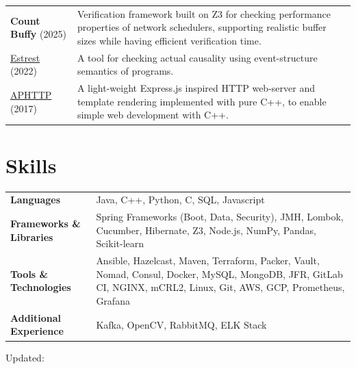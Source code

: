 \documentclass[a4paper,12pt]{article}
\newcommand{\monthyear}{\monthname[\the\month] \the\year}
\begin{document}
    \begin{tabularx}{\linewidth}{ @{}l X@{} }
        \textbf{Count Buffy} (2025) & Verification framework built on Z3 for checking performance properties of network schedulers, supporting realistic buffer sizes while having efficient verification time.\\
        \href{https://github.com/seyhani/Estrest}{Estrest} (2022) & A tool for checking actual causality using event-structure semantics of programs.\\
        \href{https://github.com/UTAP/APHTTP}{APHTTP} (2017) & A light-weight Express.js inspired HTTP web-server and template rendering implemented with pure C++, to enable simple web development with C++. \\
    \end{tabularx}

    \section{Skills}
    \begin{tabularx}{\linewidth}{@{}l X@{}}
        \textbf{Languages} & Java, C++, Python, C, SQL, Javascript \\
        \textbf{Frameworks \& Libraries} & Spring Frameworks (Boot, Data, Security), JMH, Lombok, Cucumber, Hibernate, Z3, Node.js, NumPy, Pandas, Scikit-learn \\
        \textbf{Tools \& Technologies} & Ansible, Hazelcast, Maven, Terraform, Packer, Vault, Nomad, Consul, Docker, MySQL, MongoDB, JFR, GitLab CI, NGINX, mCRL2, Linux, Git, AWS, GCP, Prometheus, Grafana \\
        \textbf{Additional Experience} & Kafka, OpenCV, RabbitMQ, ELK Stack \\
    \end{tabularx}
    \vspace{10pt}
    \enlargethispage{20pt}
    \center \scriptsize{Updated: \monthyear}
\end{document}

